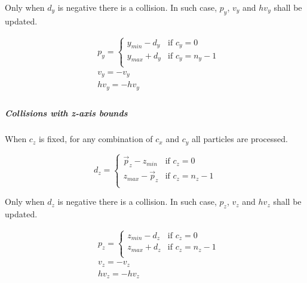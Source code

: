 Only when $d_y$ is negative there is a collision. In such case, $p_y$, $v_y$ 
and $hv_y$ shall be updated.

\[
\begin{split}
&p_y = 
  \begin{cases}
    y_{min} - d_y & \text{if } c_y = 0\\
    y_{max} + d_y & \text{if } c_y = n_y -1\\
  \end{cases}\\
&v_y = -v_y\\
&hv_y = -hv_y\\
\end{split}
\]

\subparagraph{Collisions with z-axis bounds}

When $c_z$ is fixed, for any combination of $c_x$ and $c_y$ all particles are
processed. 

\[
d_z =
\begin{cases}
  \vec{p}_z - z_{min}  & \text{if } c_z = 0\\
  z_{max} - \vec{p}_z & \text{if } c_z = n_z - 1\\
\end{cases}
\]

Only when $d_z$ is negative there is a collision. In such case, $p_z$, $v_z$ 
and $hv_z$ shall be updated.

\[
\begin{split}
&p_z = 
  \begin{cases}
    z_{min} - d_z & \text{if } c_z = 0\\
    z_{max} + d_z & \text{if } c_z = n_z -1\\
  \end{cases}\\
&v_z = -v_z\\
&hv_z = -hv_z\\
\end{split}
\]
